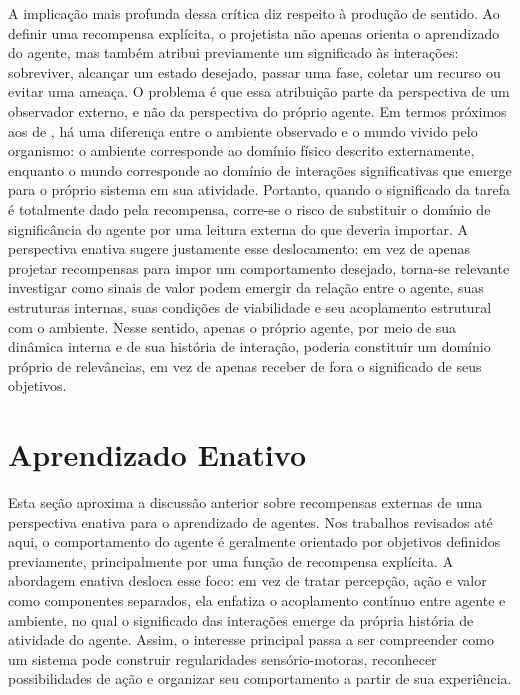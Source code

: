 A implicação mais profunda dessa crítica diz respeito à produção de sentido. Ao definir uma recompensa explícita, o projetista não apenas orienta o aprendizado do agente, mas também atribui previamente um significado às interações: sobreviver, alcançar um estado desejado, passar uma fase, coletar um recurso ou evitar uma ameaça. O problema é que essa atribuição parte da perspectiva de um observador externo, e não da perspectiva do próprio agente. Em termos próximos aos de , há uma diferença entre o ambiente observado e o mundo vivido pelo organismo: o ambiente corresponde ao domínio físico descrito externamente, enquanto o mundo corresponde ao domínio de interações significativas que emerge para o próprio sistema em sua atividade. Portanto, quando o significado da tarefa é totalmente dado pela recompensa, corre-se o risco de substituir o domínio de significância do agente por uma leitura externa do que deveria importar. A perspectiva enativa sugere justamente esse deslocamento: em vez de apenas projetar recompensas para impor um comportamento desejado, torna-se relevante investigar como sinais de valor podem emergir da relação entre o agente, suas estruturas internas, suas condições de viabilidade e seu acoplamento estrutural com o ambiente. Nesse sentido, apenas o próprio agente, por meio de sua dinâmica interna e de sua história de interação, poderia constituir um domínio próprio de relevâncias, em vez de apenas receber de fora o significado de seus objetivos.

\section{Aprendizado Enativo}

Esta seção aproxima a discussão anterior sobre recompensas externas de uma perspectiva enativa para o aprendizado de agentes. Nos trabalhos revisados até aqui, o comportamento do agente é geralmente orientado por objetivos definidos previamente, principalmente por uma função de recompensa explícita. A abordagem enativa desloca esse foco: em vez de tratar percepção, ação e valor como componentes separados, ela enfatiza o acoplamento contínuo entre agente e ambiente, no qual o significado das interações emerge da própria história de atividade do agente. Assim, o interesse principal passa a ser compreender como um sistema pode construir regularidades sensório-motoras, reconhecer possibilidades de ação e organizar seu comportamento a partir de sua experiência.

